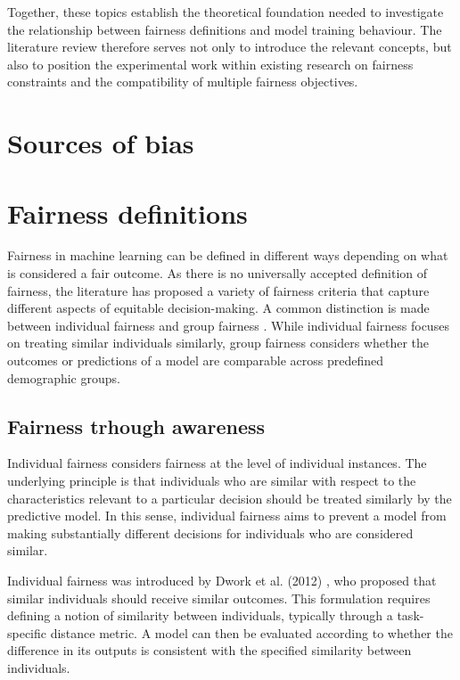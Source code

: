 Together, these topics establish the theoretical foundation needed to investigate the relationship between fairness definitions and model training behaviour. The literature review therefore serves not only to introduce the relevant concepts, but also to position the experimental work within existing research on fairness constraints and the compatibility of multiple fairness objectives.

\section{Sources of bias}

\section{Fairness definitions}
Fairness in machine learning can be defined in different ways depending on what is considered a fair outcome. As there is no universally accepted definition of fairness, the literature has proposed a variety of fairness criteria that capture different aspects of equitable decision-making. A common distinction is made between individual fairness and group fairness \cite{dwork}. While individual fairness focuses on treating similar individuals similarly, group fairness considers whether the outcomes or predictions of a model are comparable across predefined demographic groups.

\subsection{Fairness trhough awareness}
Individual fairness considers fairness at the level of individual instances. The underlying principle is that individuals who are similar with respect to the characteristics relevant to a particular decision should be treated similarly by the predictive model. In this sense, individual fairness aims to prevent a model from making substantially different decisions for individuals who are considered similar.

Individual fairness was introduced by Dwork et al. (2012) \cite{dwork}, who proposed that similar individuals should receive similar outcomes. This formulation requires defining a notion of similarity between individuals, typically through a task-specific distance metric. A model can then be evaluated according to whether the difference in its outputs is consistent with the specified similarity between individuals.

